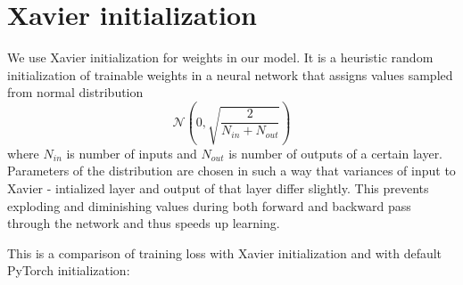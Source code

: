 \documentclass[licencjacka,en]{pracamgr}
\begin{document}
	\xavier
	
	\section{Xavier initialization}
	We use Xavier initialization \cite{XAVIER} for weights in our model. It is a heuristic random initialization of trainable weights in a neural network that assigns values sampled from normal distribution $$\mathcal{N}\left(0, \sqrt{\frac{2}{N_{in} + N_{out}}}\right)$$ where $N_{in}$ is number of inputs and $N_{out}$ is number of outputs of a certain layer. Parameters of the distribution are chosen in such a way that variances of input to Xavier - intialized layer and output of that layer differ slightly. This prevents exploding and diminishing values during both forward and backward pass through the network and thus speeds up learning.
	
	This is a comparison of training loss with Xavier initialization and with default PyTorch initialization:
	
\end{document}
